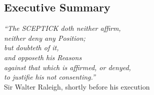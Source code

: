 %
%
%

\begin{partbacktext}
\part{Executive Summary}
\noindent

\begin{flushright}
{\em ``The SCEPTICK doth neither affirm,\\ neither deny any Position; \\but doubteth of it,  \\
and opposeth his Reasons\\ against that which is affirmed, or denyed,\\ to justifie his not consenting.''} \\
Sir  Walter Raleigh,  shortly before his execution~\cite{Raleigh}
\end{flushright}


\end{partbacktext}
